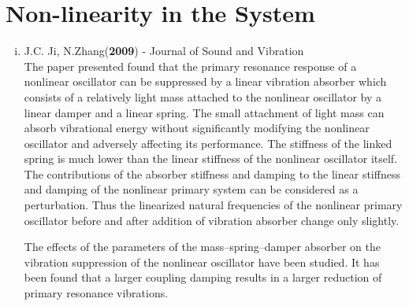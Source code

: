 \section{Non-linearity in the System}
\begin{enumerate}[i)]
\item {J.C. Ji, N.Zhang(\textbf{2009}) - Journal of Sound and Vibration}\\
The paper presented found that the primary resonance response of a nonlinear oscillator can be suppressed by a linear vibration absorber which consists of a relatively light mass attached to the nonlinear oscillator by a linear damper and a linear spring. The small attachment of light mass can absorb vibrational energy without significantly modifying the nonlinear oscillator and adversely affecting its performance. The stiffness of the linked spring is much lower than the linear stiffness of the nonlinear oscillator itself.
The contributions of the absorber stiffness and damping to the linear stiffness and damping of the nonlinear primary system can be considered as a perturbation. Thus the linearized natural frequencies of the nonlinear primary oscillator before and after addition of vibration absorber change only slightly.

The effects of the parameters of the mass–spring–damper absorber on the vibration suppression of the nonlinear oscillator have been studied. It has been found that a larger coupling damping results in a larger reduction of primary resonance vibrations.


\end{enumerate}
